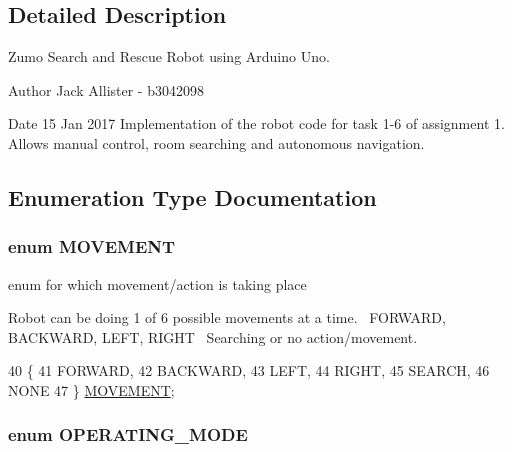 \subsection{Detailed Description}
Zumo Search and Rescue Robot using Arduino Uno. 

\begin{DoxyAuthor}{Author}
Jack Allister -\/ b3042098 
\end{DoxyAuthor}
\begin{DoxyDate}{Date}
15 Jan 2017 Implementation of the robot code for task 1-\/6 of assignment 1. Allows manual control, room searching and autonomous navigation. 
\end{DoxyDate}


\subsection{Enumeration Type Documentation}
\hypertarget{robotcode_8ino_adc716dd21485bffb9015eaeb3cfe6859}{
\subsubsection[{M\+O\+V\+E\+M\+E\+N\+T}]{\setlength{\rightskip}{0pt plus 5cm}enum {\bf M\+O\+V\+E\+M\+E\+N\+T}}}\label{robotcode_8ino_adc716dd21485bffb9015eaeb3cfe6859}


enum for which movement/action is taking place 

Robot can be doing 1 of 6 possible movements at a time.~\newline
F\+O\+R\+W\+A\+R\+D, B\+A\+C\+K\+W\+A\+R\+D, L\+E\+F\+T, R\+I\+G\+H\+T~\newline
Searching or no action/movement. 
\begin{DoxyCode}
40 \{
41   FORWARD,
42   BACKWARD,
43   LEFT,
44   RIGHT,
45   SEARCH,
46   NONE
47 \} \hyperlink{robotcode_8ino_adc716dd21485bffb9015eaeb3cfe6859}{MOVEMENT};
\end{DoxyCode}
\hypertarget{robotcode_8ino_a980e950615d86dadef54f3cfaefb5fb4}{
\subsubsection[{O\+P\+E\+R\+A\+T\+I\+N\+G\+\_\+\+M\+O\+D\+E}]{\setlength{\rightskip}{0pt plus 5cm}enum {\bf O\+P\+E\+R\+A\+T\+I\+N\+G\+\_\+\+M\+O\+D\+E}}}\label{robotcode_8ino_a980e950615d86dadef54f3cfaefb5fb4}



